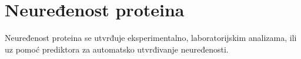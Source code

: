\section{Neuređenost proteina}

Neuređenost proteina se utvrđuje eksperimentalno, laboratorijskim analizama, ili uz pomoć prediktora za automatsko utvrđivanje neuređenosti.

